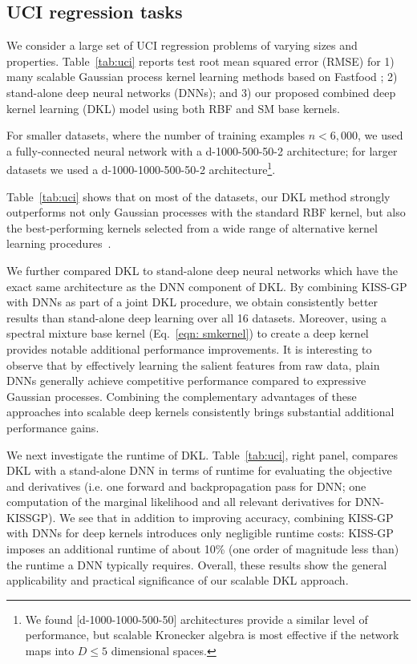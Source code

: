 \documentclass[twoside,11pt]{article}
\begin{document}
\subsection{UCI regression tasks}\label{sec:exp-uci}

We consider a large set of UCI regression problems of varying sizes and properties. Table~\ref{tab:uci}
reports test root mean squared error (RMSE) for 1) many scalable Gaussian process kernel learning methods based on Fastfood \citep{yang2015carte}; 2) stand-alone deep neural networks (DNNs); and 3) our proposed combined deep kernel learning (DKL) model using both RBF and SM base kernels.

For smaller datasets, where the number of training examples $n < 6,000$, we used a fully-connected neural network with a d-1000-500-50-2 architecture; for larger datasets we used a d-1000-1000-500-50-2 architecture\footnote{We found [d-1000-1000-500-50] architectures provide a similar level of performance, but scalable Kronecker algebra is most effective if the network maps into $D \leq 5$ dimensional spaces.}.

Table~\ref{tab:uci} shows that
on most of the datasets, our DKL method strongly outperforms not only Gaussian processes with the standard RBF kernel, but also the best-performing kernels selected from a wide range of alternative kernel learning procedures~\citep{yang2015carte}.

We further compared DKL to stand-alone deep neural networks which have the exact same architecture as the DNN component of DKL. By combining KISS-GP with DNNs as part of a joint DKL procedure, we obtain consistently better results than stand-alone deep learning over all 16 datasets.  Moreover, using a spectral mixture base kernel (Eq.~\eqref{eqn: smkernel}) to create a deep kernel provides notable additional performance improvements.
It is interesting to observe that by effectively learning the salient features from raw data, plain DNNs generally achieve competitive performance compared to expressive Gaussian processes.  Combining the complementary advantages of these approaches into scalable deep kernels consistently brings substantial additional performance gains.

We next investigate the runtime of DKL. Table~\ref{tab:uci}, right panel, compares DKL with a stand-alone DNN in terms of runtime for evaluating the objective and derivatives (i.e. one forward and backpropagation pass for DNN; one computation of the marginal likelihood and all relevant derivatives for DNN-KISSGP). We see that in addition to improving accuracy, combining KISS-GP with DNNs for deep kernels introduces only negligible runtime costs: KISS-GP imposes an additional runtime of about 10\% (one order of magnitude less than) the runtime a DNN typically requires.
Overall, these results show the general applicability and practical significance of our scalable DKL approach.
\end{document}
